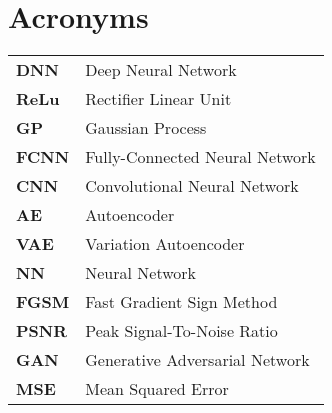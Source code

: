 \chapter*{Acronyms}

{\renewcommand{\arraystretch}{1.5}
\begin{longtabu}{l X}
\textsf{\textbf{DNN}} & Deep Neural Network \\
\textsf{\textbf{ReLu}} & Rectifier Linear Unit \\
\textsf{\textbf{GP}} & Gaussian Process \\
\textsf{\textbf{FCNN}} & Fully-Connected Neural Network \\
\textsf{\textbf{CNN}} & Convolutional Neural Network \\
\textsf{\textbf{AE}} & Autoencoder \\
\textsf{\textbf{VAE}} & Variation Autoencoder \\
\textsf{\textbf{NN}} & Neural Network \\
\textsf{\textbf{FGSM}} & Fast Gradient Sign Method \\
\textsf{\textbf{PSNR}} & Peak Signal-To-Noise Ratio \\
\textsf{\textbf{GAN}} & Generative Adversarial Network \\
\textsf{\textbf{MSE}} & Mean Squared Error \\
\end{longtabu}
}
